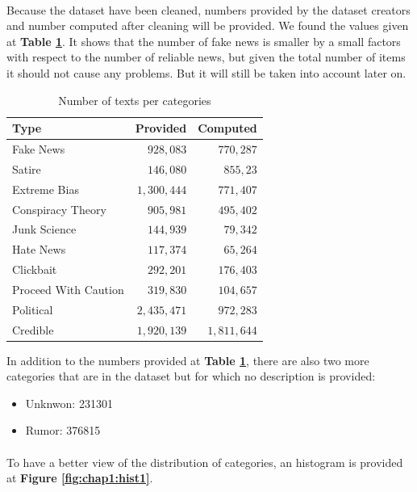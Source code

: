 \paragraph{} Because the dataset have been cleaned, numbers provided by the dataset creators and number computed after cleaning will be provided. We found the values given at \textbf{Table \ref{tab:explo:count1}}. It shows that the number of fake news is smaller by a small factors with respect to the number of reliable news, but given the total number of items it should not cause any problems. But it will still be taken into account later on. 

\begin{table}[h]
\centering
	\begin{tabular}{l|r|r}
  Type & Provided & Computed\\
  \hline
  Fake News & $928,083$ & $770,287$\\
  Satire & $146,080$ & $855,23$\\
  Extreme Bias & $1,300,444$ & $771,407$\\
  Conspiracy Theory & $905,981$ & $495,402$\\
  Junk Science & $144,939$ & $79,342$\\
  Hate News & $117,374$ & $65,264$\\
  Clickbait & $292,201$ & $176,403$\\
  Proceed With Caution & $319,830$ & $104,657$\\
  Political & $2,435,471$ & $972,283$\\
  Credible & $1,920,139$ & $1,811,644$\\
  \hline
\end{tabular}
  \caption{Number of texts per categories}
  \label{tab:explo:count1}
\end{table}

In addition to the numbers provided at \textbf{Table \ref{tab:explo:count1}}, there are also two more categories that are in the dataset but for which no description is provided: 
\begin{itemize}
  \item Unknwon: 231301
  \item Rumor: 376815
\end{itemize}

\paragraph{} To have a better view of the distribution of categories, an histogram is provided at \textbf{Figure \ref{fig:chap1:hist1}}.

